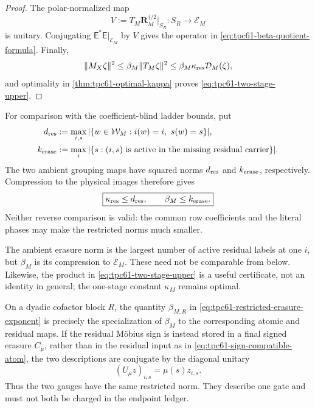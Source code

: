 \begin{proof}
The polar-normalized map
\[
 V:=T_M\mathbf R_M^{\dagger/2}|_{S_R}:S_R\longrightarrow\mathcal E_M
\]
is unitary.  Conjugating
\(\mathsf E^*\mathsf E|_{\mathcal E_M}\) by \(V\) gives the operator in
\eqref{eq:tpc61-beta-quotient-formula}.  Finally,
\[
 \|M_X\zeta\|^2
 \le\beta_M\|T_M\zeta\|^2
 \le\beta_M\kappa_{\rm res}\mathcal D_M(\zeta),
\]
and optimality in \cref{thm:tpc61-optimal-kappa} proves
\eqref{eq:tpc61-two-stage-upper}.
\end{proof}

For comparison with the coefficient-blind ladder bounds, put
\begin{align}
 d_{\rm res}
 &:=\max_{i,s}
   |\{w\in\mathcal W_M:i(w)=i,\ s(w)=s\}|,
 \label{eq:tpc61-ambient-residual-degree}\\
 k_{\rm erase}
 &:=\max_i
   |\{s:(i,s)\text{ is active in the missing residual carrier}\}|.
 \label{eq:tpc61-ambient-erasure-degree}
\end{align}
The two ambient grouping maps have squared norms \(d_{\rm res}\) and
\(k_{\rm erase}\), respectively.  Compression to the physical images
therefore gives
\begin{equation}
 \boxed{
 \kappa_{\rm res}\le d_{\rm res},
 \qquad
 \beta_M\le k_{\rm erase}.}
 \label{eq:tpc61-two-ambient-comparisons}
\end{equation}
Neither reverse comparison is valid: the common row coefficients and the
literal phases may make the restricted norms much smaller.

The ambient erasure norm is the largest number of active residual labels
at one \(i\), but \(\beta_M\) is its compression to
\(\mathcal E_M\).  These need not be comparable from below.  Likewise,
the product in \eqref{eq:tpc61-two-stage-upper} is a useful certificate,
not an identity in general; the one-stage constant \(\kappa_M\) remains
optimal.

\begin{remark}
\label{rem:tpc61-block-erasure-notation}
On a dyadic cofactor block \(R\), the quantity \(\beta_{M,R}\) in
\eqref{eq:tpc61-restricted-erasure-exponent} is precisely the specialization
of \(\beta_M\) to the corresponding atomic and residual maps.  If the
residual M\"obius sign is instead stored in a final signed erasure
\(C_\mu\), rather than in the residual input as in
\eqref{eq:tpc61-sign-compatible-atom}, the two descriptions are conjugate
by the diagonal unitary
\[
 (U_\mu z)_{i,s}=\mu(s)z_{i,s}.
\]
Thus the two gauges have the same restricted norm.  They describe one gate
and must not both be charged in
the endpoint ledger.
\end{remark}

